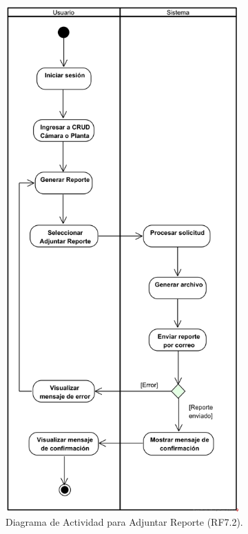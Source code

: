 \begin{figure}[H]
	\centering
		\caption{Diagrama de Actividad para Adjuntar Reporte (RF7.2).}
\includegraphics[width=0.8\textwidth]{UML/Actividad/Diagrama de Actividad RF7.2 Adjuntar Reporte.png}
\end{figure}


